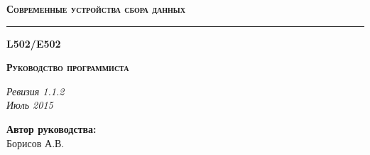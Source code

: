 \documentclass[12pt,a4paper,titlepage]{report}
\begin{document}
  \begin{titlepage}
    \topmargin=10mm
    \vspace{45mm}

    \begin{flushright}
    {\bfseries\scshape\Large Современные устройства сбора данных}
    \end{flushright}

    \rule{160mm}{2mm}                %

    \begin{flushright}
    {\bfseries\scshape\Huge L502/E502}
    \end{flushright}

    \begin{flushright}
    {\bfseries\scshape\Large Руководство программиста}
    \end{flushright}

    \vspace{155mm}


	
    \noindent
    \begin{flushright}
    {\itshape\footnotesize Ревизия 1.1.2 \\ Июль 2015}
    \end{flushright}

  \end{titlepage}
  
  
  \vspace{5mm}
  \begin{flushleft}
  \textbf{Автор руководства:} \\
  Борисов А.В.
  \end{flushleft}
  
\end{document}
